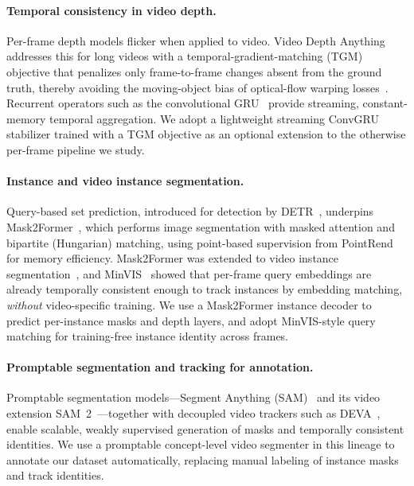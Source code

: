 \documentclass[sigconf, review=true]{acmart}
\begin{document}
\paragraph{Temporal consistency in video depth.}
Per-frame depth models flicker when applied to video. Video Depth
Anything~\cite{chen2025vda} addresses this for long videos with a
temporal-gradient-matching (TGM) objective that penalizes only frame-to-frame
changes absent from the ground truth, thereby avoiding the moving-object bias
of optical-flow warping losses~\cite{teed2020raft}. Recurrent operators such as
the convolutional GRU~\cite{ballas2016convgru} provide streaming,
constant-memory temporal aggregation. We adopt a lightweight streaming ConvGRU
stabilizer trained with a TGM objective as an optional extension to the
otherwise per-frame pipeline we study.

\paragraph{Instance and video instance segmentation.}
Query-based set prediction, introduced for detection by
DETR~\cite{carion2020detr}, underpins Mask2Former~\cite{cheng2022mask2former},
which performs image segmentation with masked attention and bipartite
(Hungarian) matching, using point-based supervision from
PointRend~\cite{kirillov2020pointrend} for memory efficiency. Mask2Former was
extended to video instance segmentation~\cite{cheng2021m2fvis}, and
MinVIS~\cite{huang2022minvis} showed that per-frame query embeddings are
already temporally consistent enough to track instances by embedding matching,
\emph{without} video-specific training. We use a Mask2Former instance decoder
to predict per-instance masks and depth layers, and adopt MinVIS-style query
matching for training-free instance identity across frames.

\paragraph{Promptable segmentation and tracking for annotation.}
Promptable segmentation models---Segment Anything (SAM)~\cite{kirillov2023sam}
and its video extension SAM~2~\cite{ravi2024sam2}---together with decoupled
video trackers such as DEVA~\cite{cheng2023deva}, enable scalable, weakly
supervised generation of masks and temporally consistent identities. We use a
promptable concept-level video segmenter in this lineage to annotate our
dataset automatically, replacing manual labeling of instance masks and track
identities.
\end{document}

